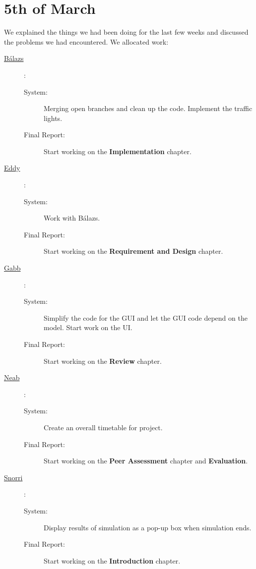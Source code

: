 \documentclass[11pt]{article}
\begin{document}
\section{5th of March}
We explained the things we had been doing for the last few weeks and discussed the problems we had encountered. We allocated work:
\begin{description}
\item[\underline{Bálazs}]: 
	\begin{description}
	\item[System: ]Merging open branches and clean up the code. Implement the traffic lights.
	\item[Final Report: ]Start working on the \textbf{Implementation} chapter.
	\end{description}
\item[\underline{Eddy}]: 
	\begin{description}
	\item[System: ]Work with Bálazs.
	\item[Final Report: ]Start working on the \textbf{Requirement and Design} chapter.
	\end{description}
\item[\underline{Gabb}]: 
	\begin{description}
	\item[System: ]Simplify the code for the GUI and let the GUI code depend on the model. Start work on the UI.
	\item[Final Report: ]Start working on the \textbf{Review} chapter.
	\end{description}
\item[\underline{Neab}]: 
	\begin{description}
	\item[System: ]Create an overall timetable for project. 
	\item[Final Report: ]Start working on the \textbf{Peer Assessment} chapter and \textbf{Evaluation}.
	\end{description}
\item[\underline{Snorri}]: 
	\begin{description}
	\item[System: ]Display results of simulation as a pop-up box when simulation ends.
	\item[Final Report: ]Start working on the \textbf{Introduction} chapter.
	\end{description}
\end{description}
\end{document}
